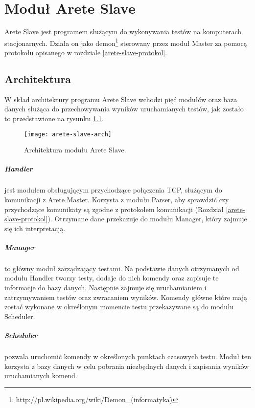 \documentclass[00-praca-magisterska.tex]{subfiles}
\begin{document}
\chapter{Moduł Arete Slave}
\label{arete-slave}

Arete Slave jest programem służącym do wykonywania testów na komputerach
stacjonarnych. Działa on jako
demon\footnote{http://pl.wikipedia.org/wiki/Demon\_(informatyka)} sterowany
przez moduł Master za pomocą protokołu opisanego w rozdziale
\ref{arete-slave-protokol}.

\section{Architektura}
\label{arete-slave-arch}

W skład architektury programu Arete Slave wchodzi pięć modułów oraz baza danych
służąca do przechowywania wyników uruchamianych testów, jak zostało to
przedstawione na rysunku \ref{fig:arete-slave-arch}.

\begin{figure}[htb]
\begin{center}
\leavevmode
\texttt{[image: arete-slave-arch]}
\end{center}
\caption{Architektura modułu Arete Slave.}
\label{fig:arete-slave-arch}
\end{figure}

\paragraph{Handler} jest modułem obsługującym przychodzące połączenia TCP,
służącym do komunikacji z Arete Master. Korzysta z modułu Parser, aby sprawdzić czy
przychodzące komunikaty są zgodne z protokołem komunikacji (Rozdział
\ref{arete-slave-protokol}). Otrzymane dane przekazuje do modułu Manager, który
zajmuje się ich interpretacją.

\paragraph{Manager} to główny moduł zarządzający testami. Na podstawie danych
otrzymanych od modułu Handler tworzy testy, dodaje do nich komendy oraz zapisuje te
informacje do bazy danych. Następnie zajmuje się uruchamianiem i zatrzymywaniem
testów oraz zwracaniem wyników. Komendy główne które mają zostać wykonane w
określonym momencie testu przekazywane są do modułu Scheduler. 

\paragraph{Scheduler} pozwala uruchomić komendy w określonych punktach czasowych
testu. Moduł ten korzysta z bazy danych w celu pobrania niezbędnych danych i
zapisania wyników uruchamianych komend.
\end{document}
